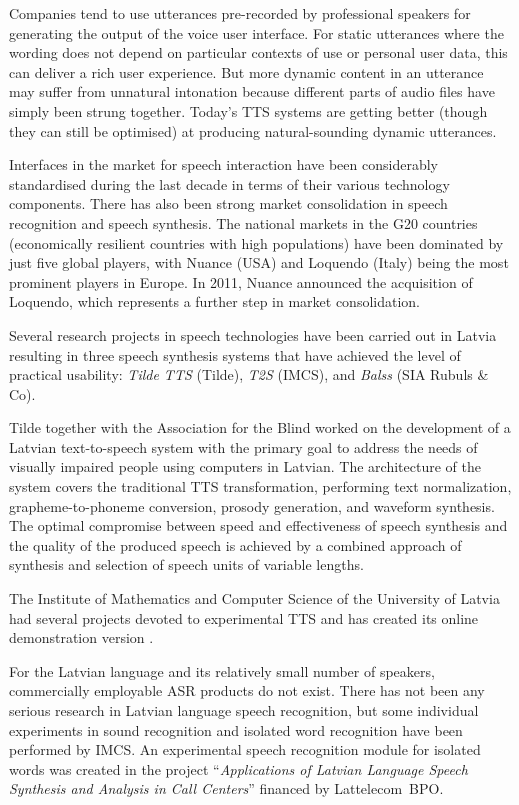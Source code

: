 \begin{multicols}{2}
Companies tend to use utterances pre-recorded by professional speakers for generating the output of the voice user interface.
For static utterances where the wording does not depend on particular contexts of use or personal user data, this can deliver a rich user experience.
But more dynamic content in an utterance may suffer from unnatural intonation because different parts of audio files have simply been strung together.
Today's TTS systems are getting better (though they can still be optimised) at producing natural-sounding dynamic utterances.  

Interfaces in the market for speech interaction have been considerably standardised during the last decade in terms of their various technology components.
There has also been strong market consolidation in speech recognition and speech synthesis.
The national markets in the G20 countries (economically resilient countries with high populations) have been dominated by just five global players, with Nuance (USA) and Loquendo (Italy) being the most prominent players in Europe.
In 2011, Nuance announced the acquisition of Loquendo, which represents a further step in market consolidation.

Several research projects in speech technologies have been carried out in Latvia resulting in three speech synthesis systems that have achieved the level of practical usability: \textit{Tilde TTS} (Tilde), \textit{T2S} (IMCS), and \textit{Balss} (SIA Rubuls \& Co). 

Tilde together with the Association for the Blind worked on the development of a Latvian text-to-speech system \cite{Meta19} with the primary goal to address the needs of visually impaired people using computers in Latvian.
The architecture of the system covers the traditional TTS transformation, performing text normalization, grapheme-to-phoneme conversion, prosody generation, and waveform synthesis.
The optimal compromise between speed and effectiveness of speech synthesis and the quality of the produced speech is achieved by a combined approach of synthesis and selection of speech units of variable lengths.

The Institute of Mathematics and Computer Science of the University of Latvia had several projects devoted to experimental TTS \cite{Meta20, Meta21} and has created its online demonstration version \cite{Meta22}.

For the Latvian language and its relatively small number of speakers, commercially employable ASR products do not exist.  There has not been any serious research in Latvian language speech recognition, but some individual experiments in sound recognition and isolated word recognition have been performed by IMCS.  An experimental speech recognition module for isolated words was created in the project ``\textit{Applications of Latvian Language Speech Synthesis and Analysis in Call Centers}'' financed by Lattelecom~BPO.


\end{multicols}
